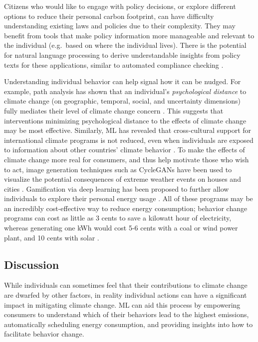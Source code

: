 \documentclass[11pt]{report}
\begin{document}
Citizens who would like to engage with policy decisions, or explore different options to reduce their personal carbon footprint, can have difficulty understanding existing laws and policies due to their complexity. They may benefit from tools that make policy information more manageable and relevant to the individual (e.g.~based on where the individual lives).
There is the potential for natural language processing to derive understandable insights from policy texts for these applications, similar to automated compliance checking \cite{doi:10.1061/(ASCE)CP.1943-5487.0000427, bell2016systems}.

Understanding individual behavior can help signal how it can be nudged. For example, path analysis has shown that an individual's \textit{psychological distance} to climate change (on geographic, temporal, social, and uncertainty dimensions) fully mediates their level of climate change concern \cite{jones2017future}. This suggests that interventions minimizing psychological distance to the effects of climate change may be most effective. Similarly, ML has revealed that cross-cultural support for international climate programs is not reduced, even when individuals are exposed to information about other countries' climate behavior  \cite{beiser2019commitment}.
To make the effects of climate change more real for consumers, and thus help motivate those who wish to act, image generation techniques such as CycleGANs have been used to visualize the potential consequences of extreme weather events on houses and cities \cite{schmidt2019visualizing}. 
Gamification via deep learning has been proposed to further allow individuals to explore their personal energy usage \cite{konstantakopoulos2019deep}. All of these programs may be an incredibly cost-effective way to reduce energy consumption; behavior change programs can cost as little as 3 cents to save a kilowatt hour of electricity, whereas generating one kWh would cost 5-6 cents with a coal or wind power plant, and 10 cents with solar \cite{peerpressureOPower, forbesEnergyCost}. 

\subsection{Discussion}
While individuals can sometimes feel that their contributions to climate change are dwarfed by other factors, in reality individual actions can have a significant impact in mitigating climate change. ML can aid this process by empowering consumers to understand which of their behaviors lead to the highest emissions, automatically scheduling energy consumption, and providing insights into how to facilitate behavior change.
\end{document}

